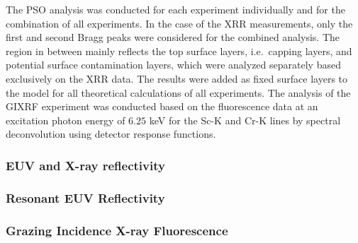 The PSO analysis was conducted for each experiment individually and for the 
combination of all experiments. In the case of the XRR measurements, only the 
first and second Bragg peaks were considered for the combined analysis. The 
region in between mainly reflects the top surface layers, i.e.~capping layers, 
and potential surface contamination layers, which were analyzed separately 
based exclusively on the XRR data. The results were added as fixed surface 
layers to the model for all theoretical calculations of all experiments. The 
analysis of the GIXRF experiment was conducted based on the fluorescence data 
at an excitation photon energy of $6.25$ keV for the Sc-K and Cr-K lines by spectral 
deconvolution using detector response functions.

\subsubsection{EUV and X-ray reflectivity}
\subsubsection{Resonant EUV Reflectivity}
\subsubsection{Grazing Incidence X-ray Fluorescence}


